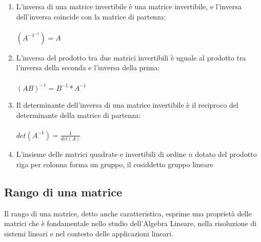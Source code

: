 \documentclass{report}
\begin{document}
\begin{enumerate}
  \item L'inversa di una matrice invertibile è una matrice invertibile, e l'inversa dell'inversa coincide con la matrice di partenza:
    \\ 
    \\
    $(A^{-1}^{-1}) = A$
  \item L'inversa del prodotto tra due matrici invertibili è uguale al prodotto tra l'inversa della seconda e l'inversa della prima:
    \\
    \\
    $(AB)^{-1} = B^{-1} * A^{-1} $
  \item Il determinante dell'inversa di una matrice invertibile è il reciproco del determinante della matrice di partenza:
    \\
    \\
    $det(A^{-1}) = \frac{1}{det(A)}$
  \item L'insieme delle matrici quadrate e invertibili di ordine $n$ dotato del prodotto riga per colonna forma un gruppo, il cosiddetto gruppo lineare
\end{enumerate}


\subsection{Rango di una matrice}

Il rango di una matrice, detto anche caratteristica, esprime una proprietà delle matrici che è fondamentale nello studio dell'Algebra Lineare, nella risoluzione di sistemi lineari e nel contesto delle applicazioni lineari.
\end{document}
